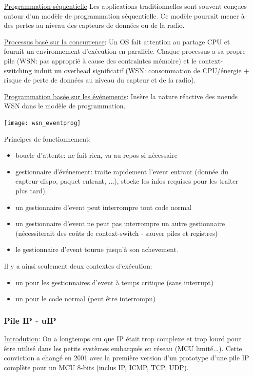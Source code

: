 \documentclass{article}
\begin{document}
\begin{sffamily}
\underline{Programmation séquentielle}
Les applications traditionnelles sont souvent conçues autour d'un modèle
de programmation séquentielle. Ce modèle pourrait mener à des pertes
au niveau des capteurs de données ou de la radio.

\underline{Processus basé sur la concurrence}:
Un OS fait attention au partage CPU et fournit un environnement d'exécution
en parallèle. Chaque processus a sa propre pile (WSN: pas approprié
à cause des contraintes mémoire) et le context-switching induit un overhead
significatif (WSN: consommation de CPU/énergie + risque de perte de données
au niveau du capteur et de la radio).

\underline{Programmation basée sur les événements}:
Insère la nature réactive des noeuds WSN dans le modèle de programmation.

\texttt{[image: wsn\_eventprog]}

Principes de fonctionnement:
\begin{itemize}
\item boucle d'attente: ne fait rien, va au repos si nécessaire
\item gestionnaire d'événement:
  traite rapidement l'event entrant (donnée du capteur
  dispo, paquet entrant, ...), stocke les infos requises pour les traiter
  plus tard).
\item un gestionnaire d'event peut interrompre tout code normal
\item un gestionnaire d'event ne peut pas interrompre un autre gestionnaire
  (nécessiterait des coûts de context-switch - sauver piles et registres)
\item le gestionnaire d'event tourne jusqu'à son achevement.
\end{itemize}
Il y a ainsi seulement deux contextes d'exécution:
\begin{itemize}
\item un pour les gestionnaires d'event à temps critique (sans interrupt)
\item un pour le code normal (peut être interrompu)
\end{itemize}

\subsubsection{Pile IP - uIP}
\underline{Introdution}:
On a longtemps cru que IP était trop complexe et trop lourd pour être utilisé
dans les petits systèmes embarqués en réseau (MCU limité...).
Cette conviction a changé en 2001 avec la première version d'un prototype
d'une pile IP complète pour un MCU 8-bits (inclus IP, ICMP, TCP, UDP).


\end{sffamily}
\end{document}
